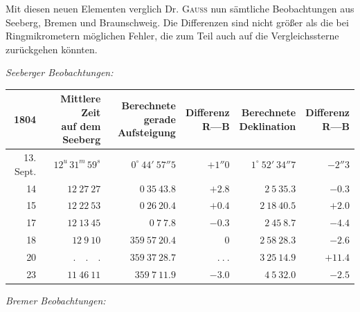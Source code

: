 Mit diesen neuen Elementen verglich Dr. \textsc{Gauss} nun sämtliche Beobachtungen aus Seeberg, Bremen und Braunschweig. Die Differenzen sind nicht größer als die bei Ringmikrometern möglichen Fehler, die zum Teil auch auf die Vergleichssterne zurückgehen könnten.

\begin{center}
\textit{Seeberger Beobachtungen:}
\end{center}

\begin{center}
\begingroup\fontsize{8}{10}\selectfont\setlength{\tabcolsep}{3pt}\renewcommand{\arraystretch}{1.12}
\begin{tabular}{r|r|r|r|r|r}
1804 & \shortstack{Mittlere Zeit\\auf dem Seeberg} & \shortstack{Berechnete gerade\\Aufsteigung} & \shortstack{Differenz\\R—B} & \shortstack{Berechnete\\Deklination} & \shortstack{Differenz\\R—B} \\ \hline
13. Sept. & $12^{u}\,31^{m}\,59^{s}$ & $0^\circ\ 44'\ 57''5$ & $+1''0$ & $1^\circ\ 52'\ 34''7$ & $-2''3$ \\
14 & $12\ 27\ 27$ & $0\ 35\ 43.8$ & $+2.8$ & $2\ 5\ 35.3$ & $-0.3$ \\
15 & $12\ 22\ 53$ & $0\ 26\ 20.4$ & $+0.4$ & $2\ 18\ 40.5$ & $+2.0$ \\
17 & $12\ 13\ 45$ & $0\ 7\ 7.8$ & $-0.3$ & $2\ 45\ 8.7$ & $-4.4$ \\
18 & $12\ 9\ 10$ & $359\ 57\ 20.4$ & $0$ & $2\ 58\ 28.3$ & $-2.6$ \\
20 & $ .\quad .\quad . $ & $359\ 37\ 28.7$ & $ .\ .\ . $ & $3\ 25\ 14.9$ & $+11.4$ \\
23 & $11\ 46\ 11$ & $359\ 7\ 11.9$ & $-3.0$ & $4\ 5\ 32.0$ & $-2.5$ \\
\end{tabular}\endgroup
\end{center}
%
\begin{center}
\textit{Bremer Beobachtungen:}
\end{center}

